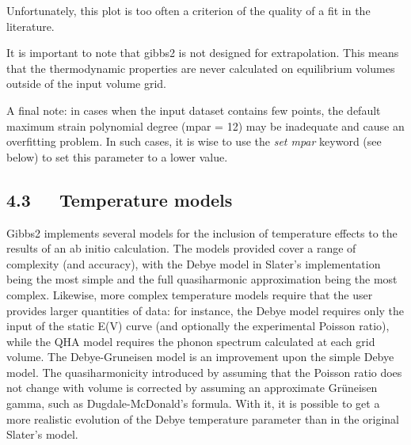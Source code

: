 \documentclass[a4paper]{article}
\begin{document}
\noindent{}

Unfortunately, this plot is too often a criterion of the quality of a
fit in the literature.

It is important to note that gibbs2 is not designed for
extrapolation. This means that the thermodynamic properties are never
calculated on equilibrium volumes outside of the input volume grid.

A final note: in cases when the input dataset contains few points, the
default maximum strain polynomial degree (mpar = 12) may be inadequate
and cause an overfitting problem. In such cases, it is wise to use the
\emph{set mpar} keyword (see below) to set this parameter to a lower
value.


\subsection{4.3~~~Temperature models%
  \label{temperature-models}%
}

Gibbs2 implements several models for the inclusion of temperature
effects to the results of an ab initio calculation. The models
provided cover a range of complexity (and accuracy), with the Debye
model in Slater's implementation being the most simple and the full
quasiharmonic approximation being the most complex. Likewise, more
complex temperature models require that the user provides larger
quantities of data: for instance, the Debye model requires only the
input of the static E(V) curve (and optionally the experimental
Poisson ratio), while the QHA model requires the phonon spectrum
calculated at each grid volume. The Debye-Gruneisen model is an
improvement upon the simple Debye model. The quasiharmonicity
introduced by assuming that the Poisson ratio does not change with
volume is corrected by assuming an approximate Grüneisen gamma, such
as Dugdale-McDonald's formula. With it, it is possible to get a more
realistic evolution of the Debye temperature parameter than in the
original Slater's model.
\end{document}
